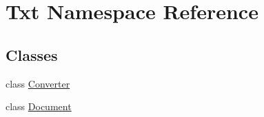 \hypertarget{namespaceTxt}{\section{Txt Namespace Reference}
\label{namespaceTxt}
}
\subsection*{Classes}
\begin{DoxyCompactItemize}
\item 
class \hyperlink{classTxt_1_1Converter}{Converter}
\item 
class \hyperlink{classTxt_1_1Document}{Document}
\end{DoxyCompactItemize}
